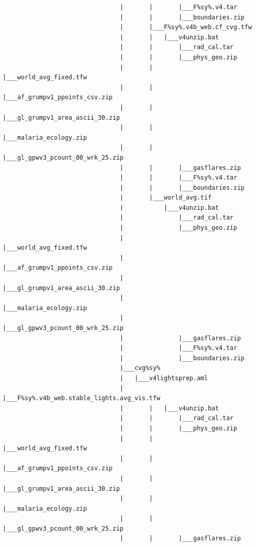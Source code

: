 \documentclass[]{book}
\begin{document}
\begin{verbatim}
                                |       |       |___F%sy%.v4.tar
                                |       |       |___boundaries.zip
                                |       |___F%sy%.v4b_web.cf_cvg.tfw
                                |       |   |___v4unzip.bat
                                |       |       |___rad_cal.tar
                                |       |       |___phys_geo.zip
                                |       |       |___world_avg_fixed.tfw
                                |       |       |___af_grumpv1_ppoints_csv.zip
                                |       |       |___gl_grumpv1_area_ascii_30.zip
                                |       |       |___malaria_ecology.zip
                                |       |       |___gl_gpwv3_pcount_00_wrk_25.zip
                                |       |       |___gasflares.zip
                                |       |       |___F%sy%.v4.tar
                                |       |       |___boundaries.zip
                                |       |___world_avg.tif
                                |           |___v4unzip.bat
                                |               |___rad_cal.tar
                                |               |___phys_geo.zip
                                |               |___world_avg_fixed.tfw
                                |               |___af_grumpv1_ppoints_csv.zip
                                |               |___gl_grumpv1_area_ascii_30.zip
                                |               |___malaria_ecology.zip
                                |               |___gl_gpwv3_pcount_00_wrk_25.zip
                                |               |___gasflares.zip
                                |               |___F%sy%.v4.tar
                                |               |___boundaries.zip
                                |___cvg%sy%
                                |   |___v4lightsprep.aml
                                |       |___F%sy%.v4b_web.stable_lights.avg_vis.tfw
                                |       |   |___v4unzip.bat
                                |       |       |___rad_cal.tar
                                |       |       |___phys_geo.zip
                                |       |       |___world_avg_fixed.tfw
                                |       |       |___af_grumpv1_ppoints_csv.zip
                                |       |       |___gl_grumpv1_area_ascii_30.zip
                                |       |       |___malaria_ecology.zip
                                |       |       |___gl_gpwv3_pcount_00_wrk_25.zip
                                |       |       |___gasflares.zip

\end{verbatim}
\end{document}

